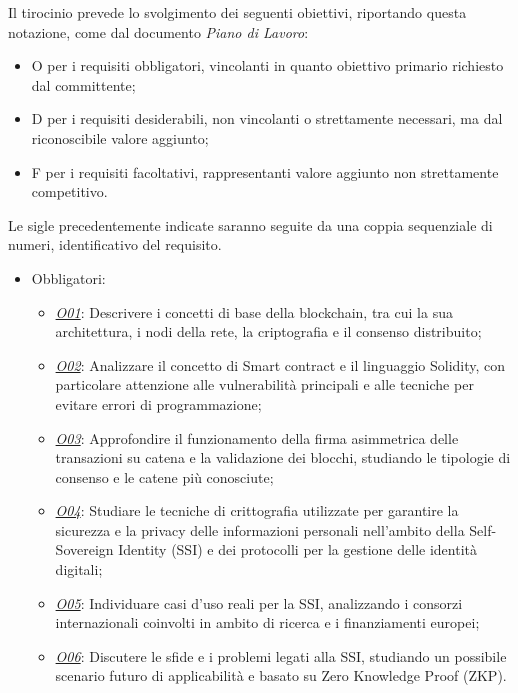 Il tirocinio prevede lo svolgimento dei seguenti obiettivi, riportando questa notazione, come dal documento \textit{Piano di Lavoro}:
\begin{itemize}
    \item O per i requisiti obbligatori, vincolanti in quanto obiettivo primario richiesto dal committente;
    \item D per i requisiti desiderabili, non vincolanti o strettamente necessari, ma dal riconoscibile valore aggiunto;
    \item F per i requisiti facoltativi, rappresentanti valore aggiunto non strettamente competitivo.
\end{itemize}
Le sigle precedentemente indicate saranno seguite da una coppia sequenziale di numeri, identificativo del requisito.

\begin{itemize}

    \item Obbligatori:
        \begin{itemize}
            \item \underline{\textit{O01}}: Descrivere i concetti di base della blockchain, tra cui la sua architettura, i nodi della rete, la criptografia e il consenso distribuito;
            \item \underline{\textit{O02}}: Analizzare il concetto di Smart contract e il linguaggio Solidity, con particolare attenzione alle vulnerabilità principali e alle tecniche per evitare errori di programmazione;
            \item \underline{\textit{O03}}: Approfondire il funzionamento della firma asimmetrica delle transazioni su catena e la validazione dei blocchi, studiando le tipologie di consenso e le catene più conosciute;
            \item \underline{\textit{O04}}: Studiare le tecniche di crittografia utilizzate per garantire la sicurezza e la privacy delle informazioni personali nell'ambito della Self-Sovereign Identity (SSI) e dei protocolli per la gestione delle identità digitali;
            \item \underline{\textit{O05}}: Individuare casi d'uso reali per la SSI, analizzando i consorzi internazionali coinvolti in ambito di ricerca e i finanziamenti europei;
            \item \underline{\textit{O06}}: Discutere le sfide e i problemi legati alla SSI, studiando un possibile scenario futuro di applicabilità e basato su Zero Knowledge Proof (ZKP).
        \end{itemize}


\end{itemize}
